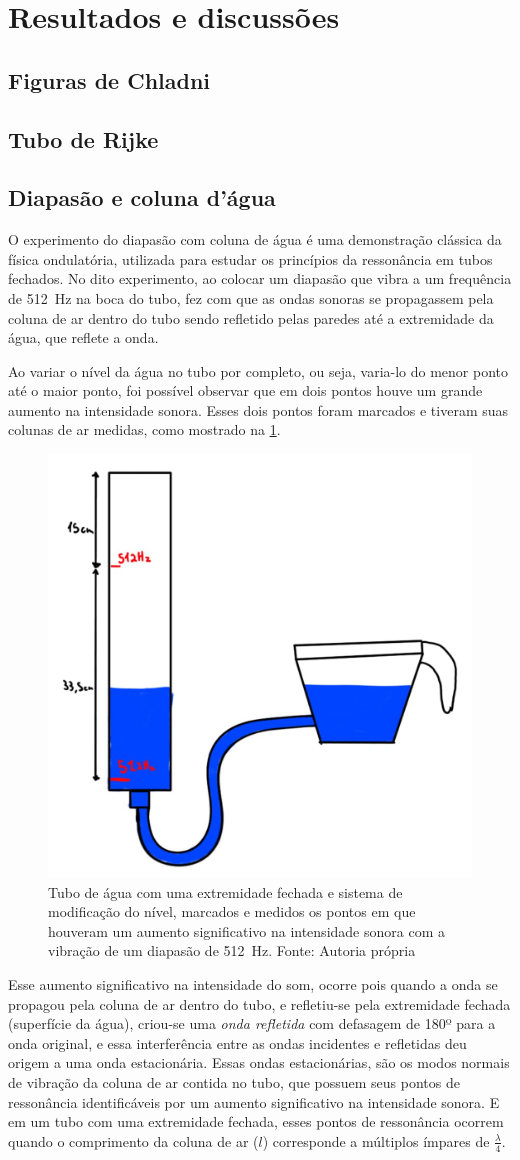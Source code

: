 \section{Resultados e discussões}
\subsection{Figuras de Chladni}

\subsection{Tubo de Rijke}

\subsection{Diapasão e coluna d'água}
O experimento do diapasão com coluna de água é uma demonstração clássica da física ondulatória, utilizada para estudar os princípios da ressonância em tubos fechados. No dito experimento, ao colocar um diapasão que vibra a um frequência de \qty{512}{Hz} na boca do tubo, fez com que as ondas sonoras se propagassem pela coluna de ar dentro do tubo sendo refletido pelas paredes até a extremidade da água, que reflete a onda. 

Ao variar o nível da água no tubo por completo, ou seja, varia-lo do menor ponto até o maior ponto, foi possível observar que em dois pontos houve um grande aumento na intensidade sonora. Esses dois pontos foram marcados e tiveram suas colunas de ar medidas, como mostrado na \cref{TuboFechado}.
\begin{figure}[H]
	\centering
	\includegraphics[width=0.35\linewidth]{fig/TuboFechado.png}
	\caption{Tubo de água com uma extremidade fechada e sistema de modificação do nível, marcados e medidos os pontos em que houveram um aumento significativo na intensidade sonora com a vibração de um diapasão de \qty{512}{Hz}. Fonte: Autoria própria}
	\label{TuboFechado}
\end{figure}

Esse aumento significativo na intensidade do som, ocorre pois quando a onda se propagou pela coluna de ar dentro do tubo, e refletiu-se pela extremidade fechada (superfície da água), criou-se uma \textit{onda refletida} com defasagem de 180º para a onda original, e essa interferência entre as ondas incidentes e refletidas deu origem a uma onda estacionária. Essas ondas estacionárias, são os modos normais de vibração da coluna de ar contida no tubo, que possuem seus pontos de ressonância identificáveis por um aumento significativo na intensidade sonora. E em um tubo com uma extremidade fechada, esses pontos de ressonância ocorrem quando o comprimento da coluna de ar (\(l\)) corresponde a múltiplos ímpares de \(\frac{\lambda}{4}\).

